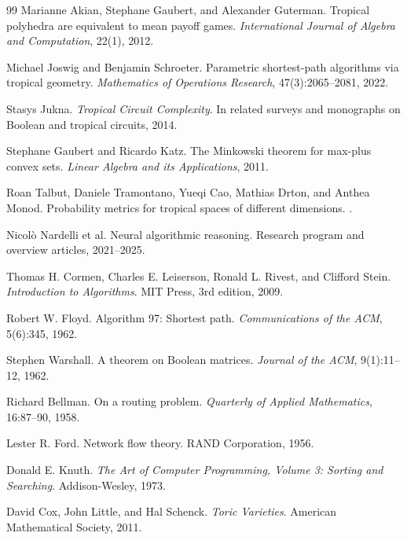 \documentclass[11pt]{article}
\begin{document}
\begin{thebibliography}{99}
Marianne Akian, Stephane Gaubert, and Alexander Guterman.
\newblock Tropical polyhedra are equivalent to mean payoff games.
\newblock \emph{International Journal of Algebra and Computation}, 22(1), 2012.

Michael Joswig and Benjamin Schroeter.
\newblock Parametric shortest-path algorithms via tropical geometry.
\newblock \emph{Mathematics of Operations Research}, 47(3):2065--2081, 2022.

Stasys Jukna.
\newblock \emph{Tropical Circuit Complexity}.
\newblock In related surveys and monographs on Boolean and tropical circuits, 2014.

Stephane Gaubert and Ricardo Katz.
\newblock The Minkowski theorem for max-plus convex sets.
\newblock \emph{Linear Algebra and its Applications}, 2011.

Roan Talbut, Daniele Tramontano, Yueqi Cao, Mathias Drton, and Anthea Monod.
\newblock Probability metrics for tropical spaces of different dimensions.
.

Nicol\`o Nardelli et al.
\newblock Neural algorithmic reasoning.
\newblock Research program and overview articles, 2021--2025.

Thomas H. Cormen, Charles E. Leiserson, Ronald L. Rivest, and Clifford Stein.
\newblock \emph{Introduction to Algorithms}.
\newblock MIT Press, 3rd edition, 2009.

Robert W. Floyd.
\newblock Algorithm 97: Shortest path.
\newblock \emph{Communications of the ACM}, 5(6):345, 1962.

Stephen Warshall.
\newblock A theorem on Boolean matrices.
\newblock \emph{Journal of the ACM}, 9(1):11--12, 1962.

Richard Bellman.
\newblock On a routing problem.
\newblock \emph{Quarterly of Applied Mathematics}, 16:87--90, 1958.

Lester R. Ford.
\newblock Network flow theory.
\newblock RAND Corporation, 1956.

Donald E. Knuth.
\newblock \emph{The Art of Computer Programming, Volume 3: Sorting and Searching}.
\newblock Addison-Wesley, 1973.

David Cox, John Little, and Hal Schenck.
\newblock \emph{Toric Varieties}.
\newblock American Mathematical Society, 2011.


\end{thebibliography}
\end{document}
